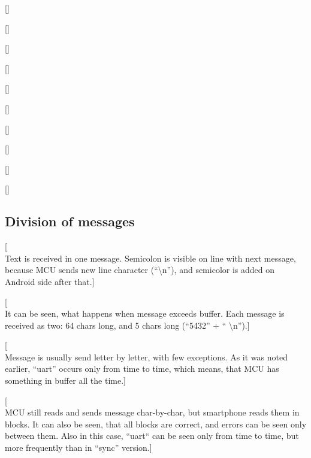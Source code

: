 []

[]

[]

[]

[]

[]

[]

[]

[]

[]

\clearpage

\subsection{Division of messages}

[\\Text is received in one message. 
Semicolon is visible on line with next message, because MCU sends new line
character (``\textbackslash n''), and semicolor is added on Android side after that.]

[\\It can be seen, what happens when message exceeds buffer.
Each message is received as two:
64 chars long, and 5 chars long (``5432'' + `` \textbackslash n'').]

[\\Message is usually send letter by letter, with few exceptions.
As it was noted earlier, ``uart'' occurs only from time to time, which means,
that MCU has something in buffer all the time.]

[\\MCU still reads and sends message char-by-char, but smartphone reads them in
blocks. 
It can also be seen, that all blocks are correct, and errors can be
seen only between them. 
Also in this case, ``uart`` can be seen only from time to time, but more
frequently than in ``sync'' version.]

